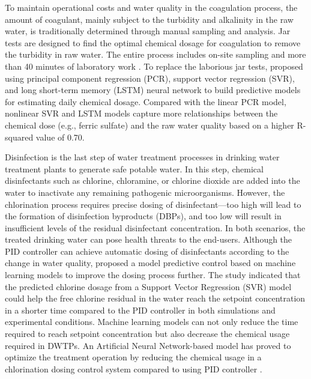 To maintain operational costs and water quality in the coagulation process, the amount of coagulant, mainly subject to the turbidity and alkalinity in the raw water, is traditionally determined through manual sampling and analysis. Jar tests are designed to find the optimal chemical dosage for coagulation to remove the turbidity in raw water. The entire process includes on-site sampling and more than 40 minutes of laboratory work \citep{ganiEffectPHAlum2017}. To replace the laborious jar tests, \citet{wangIntegratingWaterQuality2022} proposed using principal component regression (PCR), support vector regression (SVR), and long short-term memory (LSTM) neural network to build predictive models for estimating daily chemical dosage. Compared with the linear PCR model, nonlinear SVR and LSTM models capture more relationships between the chemical dose (e.g., ferric sulfate) and the raw water quality based on a higher R-squared value of 0.70.


Disinfection is the last step of water treatment processes in drinking water treatment plants to generate safe potable water. In this step, chemical disinfectants such as chlorine, chloramine, or chlorine dioxide are added into the water to inactivate any remaining pathogenic microorganisms. However, the chlorination process requires precise dosing of disinfectant---too high will lead to the formation of disinfection byproducts (DBPs), and too low will result in insufficient levels of the residual disinfectant concentration. In both scenarios, the treated drinking water can pose health threats to the end-users. Although the PID controller can achieve automatic dosing of disinfectants according to the change in water quality, \citet{wangModelPredictiveControl2020} proposed a model predictive control based on machine learning models to improve the dosing process further. The study indicated that the predicted chlorine dosage from a Support Vector Regression (SVR) model could help the free chlorine residual in the water reach the setpoint concentration in a shorter time compared to the PID controller in both simulations and experimental conditions. Machine learning models can not only reduce the time required to reach setpoint concentration but also decrease the chemical usage required in DWTPs. An Artificial Neural Network-based model has proved to optimize the treatment operation by reducing the chemical usage in a chlorination dosing control system compared to using PID controller \citep{librantzArtificialNeuralNetworks2018}.

